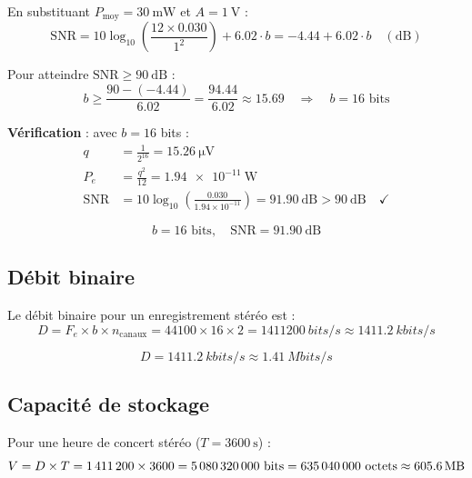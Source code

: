 \documentclass[12pt, a4paper, french]{article}
\newcommand{\Fe}{F_e}
\newcommand{\SNR}{\text{SNR}}
\newcommand{\dB}{\text{dB}}
\begin{document}
En substituant $P_{\text{moy}} = \SI{30}{\milli\watt}$ et $A = \SI{1}{\volt}$ :
\begin{equation}
    \SNR = 10 \log_{10}\left(\frac{12 \times 0.030}{1^2}\right) + 6.02 \cdot b = -4.44 + 6.02 \cdot b \quad (\dB)
\end{equation}

Pour atteindre $\SNR \geq \SI{90}{\dB}$ :
\begin{equation}
    b \geq \frac{90 - (-4.44)}{6.02} = \frac{94.44}{6.02} \approx 15.69 \quad \Rightarrow \quad b = 16 \text{ bits}
\end{equation}

\textbf{Vérification} : avec $b = 16$ bits :
\begin{align}
    q &= \frac{1}{2^{16}} = \SI{15.26}{\micro\volt} \\
    P_e &= \frac{q^2}{12} = \SI{1.94e-11}{\watt} \\
    \SNR &= 10 \log_{10}\left(\frac{0.030}{1.94 \times 10^{-11}}\right) = \SI{91.90}{\dB} > \SI{90}{\dB} \quad \checkmark
\end{align}

\begin{equation}
    \boxed{b = 16 \text{ bits}, \quad \SNR = \SI{91.90}{\dB}}
\end{equation}

\subsection{Débit binaire}

Le débit binaire pour un enregistrement stéréo est :
\begin{equation}
    D = \Fe \times b \times n_{\text{canaux}} = 44100 \times 16 \times 2 = \SI{1411200}{bits/s} \approx \SI{1411.2}{kbits/s}
    \label{eq:debit}
\end{equation}

\begin{equation}
    \boxed{D = \SI{1411.2}{kbits/s} \approx \SI{1.41}{Mbits/s}}
\end{equation}

\subsection{Capacité de stockage}

Pour une heure de concert stéréo ($T = \SI{3600}{\second}$) :
\begin{equation}
    V = D \times T = 1\,411\,200 \times 3600 = 5\,080\,320\,000 \text{ bits} = 635\,040\,000 \text{ octets} \approx \SI{605.6}{\mega\byte}
\end{equation}
\end{document}
